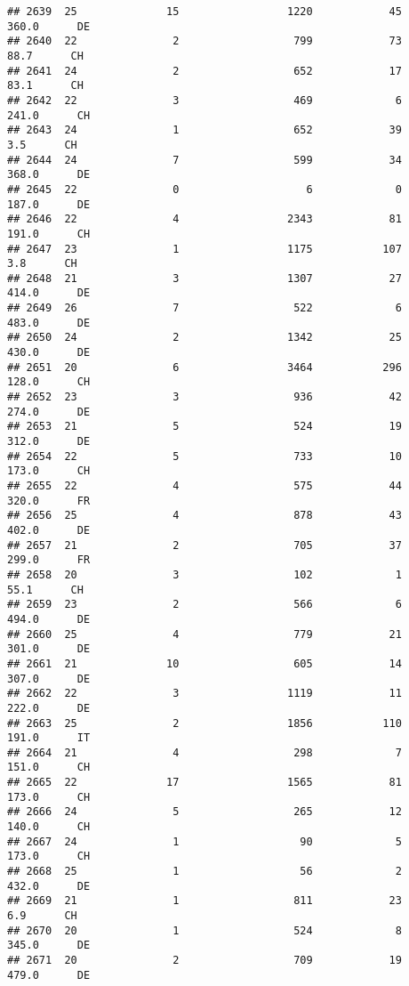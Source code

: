 \documentclass[
]{article}
\begin{document}
\begin{verbatim}
## 2639  25              15                 1220            45    360.0      DE
## 2640  22               2                  799            73     88.7      CH
## 2641  24               2                  652            17     83.1      CH
## 2642  22               3                  469             6    241.0      CH
## 2643  24               1                  652            39      3.5      CH
## 2644  24               7                  599            34    368.0      DE
## 2645  22               0                    6             0    187.0      DE
## 2646  22               4                 2343            81    191.0      CH
## 2647  23               1                 1175           107      3.8      CH
## 2648  21               3                 1307            27    414.0      DE
## 2649  26               7                  522             6    483.0      DE
## 2650  24               2                 1342            25    430.0      DE
## 2651  20               6                 3464           296    128.0      CH
## 2652  23               3                  936            42    274.0      DE
## 2653  21               5                  524            19    312.0      DE
## 2654  22               5                  733            10    173.0      CH
## 2655  22               4                  575            44    320.0      FR
## 2656  25               4                  878            43    402.0      DE
## 2657  21               2                  705            37    299.0      FR
## 2658  20               3                  102             1     55.1      CH
## 2659  23               2                  566             6    494.0      DE
## 2660  25               4                  779            21    301.0      DE
## 2661  21              10                  605            14    307.0      DE
## 2662  22               3                 1119            11    222.0      DE
## 2663  25               2                 1856           110    191.0      IT
## 2664  21               4                  298             7    151.0      CH
## 2665  22              17                 1565            81    173.0      CH
## 2666  24               5                  265            12    140.0      CH
## 2667  24               1                   90             5    173.0      CH
## 2668  25               1                   56             2    432.0      DE
## 2669  21               1                  811            23      6.9      CH
## 2670  20               1                  524             8    345.0      DE
## 2671  20               2                  709            19    479.0      DE

\end{verbatim}
\end{document}
